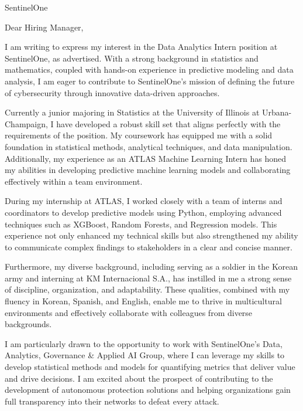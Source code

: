 \documentclass{letter}
\begin{document}
\begin{letter}{
    SentinelOne\\
}


\opening{Dear Hiring Manager,}

I am writing to express my interest in the Data Analytics Intern position at SentinelOne, as advertised. With a strong background in statistics and mathematics, coupled with hands-on experience in predictive modeling and data analysis, I am eager to contribute to SentinelOne's mission of defining the future of cybersecurity through innovative data-driven approaches.

Currently a junior majoring in Statistics at the University of Illinois at Urbana-Champaign, I have developed a robust skill set that aligns perfectly with the requirements of the position. My coursework has equipped me with a solid foundation in statistical methods, analytical techniques, and data manipulation. Additionally, my experience as an ATLAS Machine Learning Intern has honed my abilities in developing predictive machine learning models and collaborating effectively within a team environment.

During my internship at ATLAS, I worked closely with a team of interns and coordinators to develop predictive models using Python, employing advanced techniques such as XGBoost, Random Forests, and Regression models. This experience not only enhanced my technical skills but also strengthened my ability to communicate complex findings to stakeholders in a clear and concise manner.

Furthermore, my diverse background, including serving as a soldier in the Korean army and interning at KM Internacional S.A., has instilled in me a strong sense of discipline, organization, and adaptability. These qualities, combined with my fluency in Korean, Spanish, and English, enable me to thrive in multicultural environments and effectively collaborate with colleagues from diverse backgrounds.

I am particularly drawn to the opportunity to work with SentinelOne's Data, Analytics, Governance & Applied AI Group, where I can leverage my skills to develop statistical methods and models for quantifying metrics that deliver value and drive decisions. I am excited about the prospect of contributing to the development of autonomous protection solutions and helping organizations gain full transparency into their networks to defeat every attack.


\end{letter}
\end{document}
